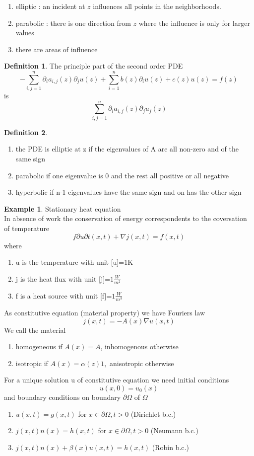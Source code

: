 \documentclass[english]{article}
\theoremstyle{definition}
\newtheorem*{defi}{Definition}
\newtheorem*{exa}{Example}
\theoremstyle{remark}
\newcommand{\f}[2]{\frac{#1}{#2}}							%
\newcommand{\p}{\partial}
\renewcommand{\aa}{\alpha}		%
\newcommand{\bb}{\beta}					%
\newcommand{\OO}{\Omega}
\newcommand{\tri}{\nabla}
\begin{document}
\begin{enumerate}
\item elliptic : an incident at $z$ influences all points in the neighborhoods.
\item parabolic : there is one direction from $z$ where the influence is only for larger values
\item there are areas of influence
\end{enumerate}
\begin{defi} The principle part of the second order PDE 
  $$-\sum_{i,j=1}^n \p_i a_{i,j}(z)\p_j u(z) + \sum_{i=1}^n b(z)\p_i u(z) + c(z) u(z) = f(z)$$
  is $$\sum_{i,j=1}^n \p_i a_{i,j}(z) \p_j u_j(z)$$
\end{defi}
\begin{defi}
  \begin{enumerate}
  \item the PDE is elliptic  at z if the eigenvalues of A are all non-zero and of the same sign
  \item parabolic  if one eigenvalue is 0 and the rest all positive or all negative
  \item hyperbolic  if n-1 eigenvalues have the same sign and on has the other sign
  \end{enumerate}
\end{defi}

\begin{exa} Stationary heat equation\\
  In absence of work the conservation of energy correspondents to the coversation of temperature
  $$f{\p u}{\p t}(x,t) + \tri j (x,t)= f(x,t)$$
  where
  \begin{enumerate}
  \item u is the temperature with unit [u]=1K
  \item j is the heat flux with unit [j]=$1\f{W}{m^2}$
  \item f is a heat source with unit [f]=$1\f{W}{m^3}$
  \end{enumerate}
  As constitutive equation (material property) we have Fouriers law 
  $$j(x,t)=-A(x)\tri u(x,t)$$
  We call the material 
  \begin{enumerate}
  \item homogeneous  if $A(x)=A$, inhomogenous otherwise
  \item isotropic  if $A(x)= \aa(z)1,$ anisotropic otherwise
  \end{enumerate}
\end{exa}
For a unique solution u of constitutive equation we need initial conditions
$$u(x,0)= u_0 (x)$$
and boundary conditions  on boundary $\p \OO$ of $\OO$
\begin{enumerate}
\item $u(x,t)= g(x,t)$ for $x \in \p \OO, t>0$ (Dirichlet b.c.)
\item $j(x,t) n(x) = h(x,t)$ for $x \in \p\OO, t>0$ (Neumann b.c.)
\item $j(x,t) n(x) + \bb(x) u(x,t) = h(x,t)$ (Robin b.c.)
\end{enumerate}
\end{document}
